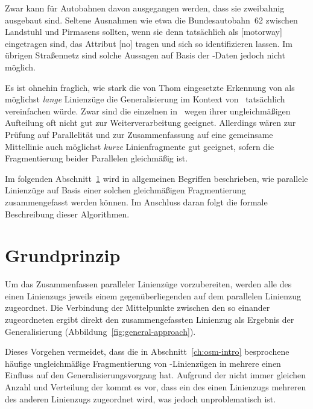 \documentclass[../main/thesis.tex]{subfiles}
\begin{document}
Zwar kann für Autobahnen davon ausgegangen werden, dass sie zweibahnig ausgebaut sind.
Seltene Ausnahmen wie etwa die Bundesautobahn~62 zwischen Landstuhl und Pirmasens sollten, wenn sie denn tatsächlich als [motorway] eingetragen sind, das Attribut [no] tragen und sich so identifizieren lassen.
Im übrigen Straßennetz sind solche Aussagen auf Basis der \osm-Daten jedoch nicht möglich.

Es ist ohnehin fraglich, wie stark die von Thom eingesetzte Erkennung von  als möglichst \emph{lange} Linienzüge die Generalisierung im Kontext von \osm\ tatsächlich vereinfachen würde.
Zwar sind die einzelnen  in \osm\ wegen ihrer ungleichmäßigen Aufteilung oft nicht gut zur Weiterverarbeitung geeignet.
Allerdings wären zur Prüfung auf Parallelität und zur Zusammenfassung auf eine gemeinsame Mittellinie auch möglichst \emph{kurze} Linienfragmente gut geeignet, sofern die Fragmentierung beider Parallelen gleichmäßig ist.

Im folgenden Abschnitt~\ref{ch:algorithm-principle} wird in allgemeinen Begriffen beschrieben, wie parallele Linienzüge auf Basis einer solchen gleichmäßigen Fragmentierung zusammengefasst werden können.
Im Anschluss daran folgt die formale Beschreibung dieser Algorithmen.




\section{Grundprinzip}
\label{ch:algorithm-principle}

Um das Zusammenfassen paralleler Linienzüge vorzubereiten, werden alle  des einen Linienzugs jeweils einem gegenüberliegenden  auf dem parallelen Linienzug zugeordnet.
Die Verbindung der Mittelpunkte zwischen den so einander zugeordneten  ergibt direkt den zusammengefassten Linienzug als Ergebnis der Generalisierung (Abbildung~\ref{fig:general-approach}).

Dieses Vorgehen vermeidet, dass die in Abschnitt~\ref{ch:osm-intro} besprochene häufige ungleichmäßige Fragmentierung von \osm-Linienzügen in mehrere  einen Einfluss auf den Generalisierungsvorgang hat.
Aufgrund der nicht immer gleichen Anzahl und Verteilung der  kommt es vor, dass ein  des einen Linienzugs mehreren  des anderen Linienzugs zugeordnet wird, was jedoch unproblematisch ist.
\end{document}
